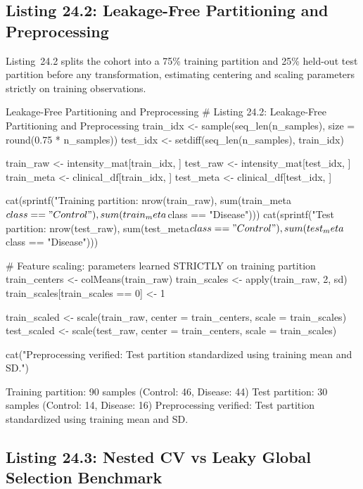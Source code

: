 \documentclass[11pt,twoside,openright]{book}
\begin{document}
\subsection{Listing 24.2: Leakage-Free Partitioning and Preprocessing}

Listing~24.2 splits the cohort into a 75\% training partition and 25\% held-out test partition before any transformation, estimating centering and scaling parameters strictly on training observations.

\begin{rchunk}{Leakage-Free Partitioning and Preprocessing}
# Listing 24.2: Leakage-Free Partitioning and Preprocessing
train_idx <- sample(seq_len(n_samples), size = round(0.75 * n_samples))
test_idx  <- setdiff(seq_len(n_samples), train_idx)

train_raw  <- intensity_mat[train_idx, ]
test_raw   <- intensity_mat[test_idx,  ]
train_meta <- clinical_df[train_idx, ]
test_meta  <- clinical_df[test_idx,  ]

cat(sprintf("Training partition: %
            nrow(train_raw), sum(train_meta$class == "Control"), sum(train_meta$class == "Disease")))
cat(sprintf("Test partition:     %
            nrow(test_raw), sum(test_meta$class == "Control"), sum(test_meta$class == "Disease")))

# Feature scaling: parameters learned STRICTLY on training partition
train_centers <- colMeans(train_raw)
train_scales  <- apply(train_raw, 2, sd)
train_scales[train_scales == 0] <- 1

train_scaled <- scale(train_raw, center = train_centers, scale = train_scales)
test_scaled  <- scale(test_raw,  center = train_centers, scale = train_scales)

cat("Preprocessing verified: Test partition standardized using training mean and SD.\n")
\end{rchunk}

\begin{routput}
Training partition: 90 samples (Control: 46, Disease: 44)
Test partition:     30 samples (Control: 14, Disease: 16)
Preprocessing verified: Test partition standardized using training mean and SD.
\end{routput}

\subsection{Listing 24.3: Nested CV vs Leaky Global Selection Benchmark}
\end{document}
